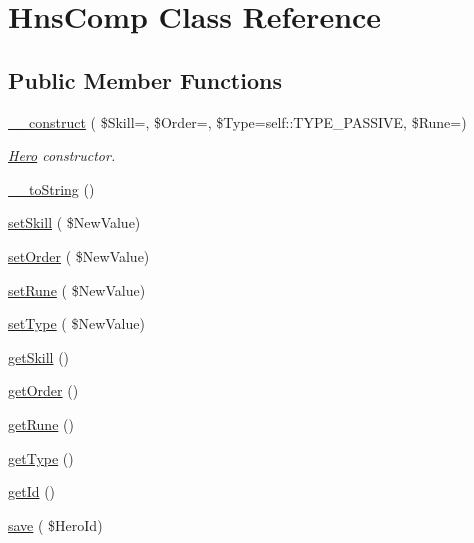 \hypertarget{class_hns_comp}{}\section{Hns\+Comp Class Reference}
\label{class_hns_comp}
\subsection*{Public Member Functions}
\begin{DoxyCompactItemize}
\item 
\hyperlink{class_hns_comp_a71919015da42681c27e434596d1a61ab}{\+\_\+\+\_\+construct} ( \$Skill=\textquotesingle{}\textquotesingle{}, \$Order=\textquotesingle{}\textquotesingle{}, \$Type=self\+::\+T\+Y\+P\+E\+\_\+\+P\+A\+S\+S\+I\+VE, \$Rune=\textquotesingle{}\textquotesingle{})
\begin{DoxyCompactList}\small\item\em \hyperlink{class_hero}{Hero} constructor. \end{DoxyCompactList}\item 
\hyperlink{class_hns_comp_a6f47311d2196eb084644aac94a9fcb1b}{\+\_\+\+\_\+to\+String} ()
\item 
\hyperlink{class_hns_comp_a007a58a665b3f0f530b92b67e38f7eba}{set\+Skill} ( \$New\+Value)
\item 
\hyperlink{class_hns_comp_a501b33cbe91e2976f5489779d89ebebd}{set\+Order} ( \$New\+Value)
\item 
\hyperlink{class_hns_comp_ae086dd8569732b25182a768ebdfef669}{set\+Rune} ( \$New\+Value)
\item 
\hyperlink{class_hns_comp_a3f3b116ce85376d1cfe61e2b2d1d72ac}{set\+Type} ( \$New\+Value)
\item 
\hyperlink{class_hns_comp_a3dd86b7da57237f33e155ee145ee3d8c}{get\+Skill} ()
\item 
\hyperlink{class_hns_comp_a72dab504bf9f274ff6d86eedaab8bab3}{get\+Order} ()
\item 
\hyperlink{class_hns_comp_a8dfd5e7ff9223a0ee17da5f691f5c843}{get\+Rune} ()
\item 
\hyperlink{class_hns_comp_a9222ea4e7c469d7c7596d649d1128cc0}{get\+Type} ()
\item 
\hyperlink{class_hns_comp_a80efbbc0b92788ed743e316f8302f341}{get\+Id} ()
\item 
\hyperlink{class_hns_comp_a944af7f4ecf66994cf2ed4cbb27a566e}{save} ( \$Hero\+Id)
\end{DoxyCompactItemize}
